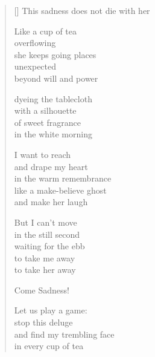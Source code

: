\documentclass[11pt,a4paper]{article}
\begin{document}
\thispagestyle{empty}

\poemtitle{}

\settowidth{\versewidth}{This sadness does not die with you}

\bigskip

\begin{verse}[\versewidth]
This sadness does not die with her

Like a cup of tea\\
overflowing\\
she keeps going places\\
unexpected\\
beyond will and power

dyeing the tablecloth\\
with a silhouette\\
of sweet fragrance\\
in the white morning

I want to reach\\
and drape my heart\\
in the warm remembrance\\
like a make-believe ghost\\
and make her laugh

But I can't move\\
in the still second\\
waiting for the ebb\\
to take me away\\
to take her away

Come Sadness!

Let us play a game:\\
stop this deluge\\
and find my trembling face\\
in every cup of tea
\end{verse}
\end{document}
